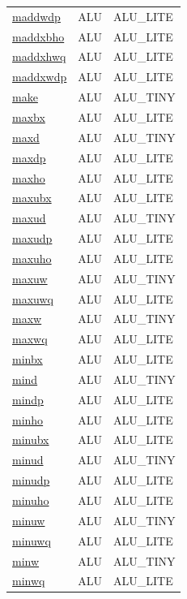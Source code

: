 \begin{small}
\begin{longtable}[l]{l l l}
\hyperlink{lvx.maddwdp}{maddwdp} & ALU & ALU\_LITE \\ 
\hyperlink{lvx.maddxbho}{maddxbho} & ALU & ALU\_LITE \\ 
\hyperlink{lvx.maddxhwq}{maddxhwq} & ALU & ALU\_LITE \\ 
\hyperlink{lvx.maddxwdp}{maddxwdp} & ALU & ALU\_LITE \\ 
\hyperlink{lvx.make}{make} & ALU & ALU\_TINY \\ 
\hyperlink{lvx.maxbx}{maxbx} & ALU & ALU\_LITE \\ 
\hyperlink{lvx.maxd}{maxd} & ALU & ALU\_TINY \\ 
\hyperlink{lvx.maxdp}{maxdp} & ALU & ALU\_LITE \\ 
\hyperlink{lvx.maxho}{maxho} & ALU & ALU\_LITE \\ 
\hyperlink{lvx.maxubx}{maxubx} & ALU & ALU\_LITE \\ 
\hyperlink{lvx.maxud}{maxud} & ALU & ALU\_TINY \\ 
\hyperlink{lvx.maxudp}{maxudp} & ALU & ALU\_LITE \\ 
\hyperlink{lvx.maxuho}{maxuho} & ALU & ALU\_LITE \\ 
\hyperlink{lvx.maxuw}{maxuw} & ALU & ALU\_TINY \\ 
\hyperlink{lvx.maxuwq}{maxuwq} & ALU & ALU\_LITE \\ 
\hyperlink{lvx.maxw}{maxw} & ALU & ALU\_TINY \\ 
\hyperlink{lvx.maxwq}{maxwq} & ALU & ALU\_LITE \\ 
\hyperlink{lvx.minbx}{minbx} & ALU & ALU\_LITE \\ 
\hyperlink{lvx.mind}{mind} & ALU & ALU\_TINY \\ 
\hyperlink{lvx.mindp}{mindp} & ALU & ALU\_LITE \\ 
\hyperlink{lvx.minho}{minho} & ALU & ALU\_LITE \\ 
\hyperlink{lvx.minubx}{minubx} & ALU & ALU\_LITE \\ 
\hyperlink{lvx.minud}{minud} & ALU & ALU\_TINY \\ 
\hyperlink{lvx.minudp}{minudp} & ALU & ALU\_LITE \\ 
\hyperlink{lvx.minuho}{minuho} & ALU & ALU\_LITE \\ 
\hyperlink{lvx.minuw}{minuw} & ALU & ALU\_TINY \\ 
\hyperlink{lvx.minuwq}{minuwq} & ALU & ALU\_LITE \\ 
\hyperlink{lvx.minw}{minw} & ALU & ALU\_TINY \\ 
\hyperlink{lvx.minwq}{minwq} & ALU & ALU\_LITE \\ 

\end{longtable}
\end{small}
